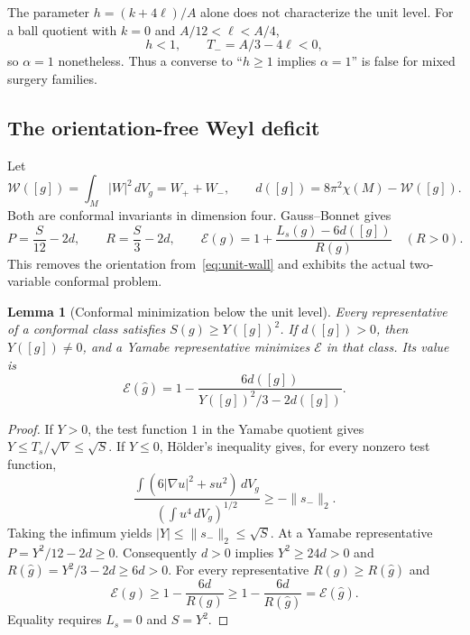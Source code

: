 \documentclass[11pt]{article}
\newcommand{\dd}{\,dV_g}
\newcommand{\cE}{\mathcal E}
\newtheorem{lemma}[theorem]{Lemma}
\theoremstyle{definition}
\theoremstyle{remark}
\begin{document}
The parameter $h=(k+4\ell)/A$ alone does not characterize the unit level.
For a ball quotient with $k=0$ and $A/12<\ell<A/4$,
\[
 h<1,\qquad T_-=A/3-4\ell<0,
\]
so $\alpha=1$ nonetheless. Thus a converse to
``$h\ge1$ implies $\alpha=1$'' is false for mixed surgery families.

\subsection{The orientation-free Weyl deficit}
\label{sec:weyl-deficit}

Let
\begin{equation}
 \mathcal W([g])=\int_M|W|^2\dd=W_++W_-,\qquad
 d([g])=8\pi^2\chi(M)-\mathcal W([g]).
 \label{eq:d-def}
\end{equation}
Both are conformal invariants in dimension four. Gauss--Bonnet gives
\begin{equation}
 P=\frac S{12}-2d,\qquad R=\frac S3-2d,
 \qquad
 \boxed{\cE(g)=1+\frac{L_s(g)-6d([g])}{R(g)}}\quad(R>0).
 \label{eq:orientation-free}
\end{equation}
This removes the orientation from~\eqref{eq:unit-wall} and exhibits
the actual two-variable conformal problem.

\begin{lemma}[Conformal minimization below the unit level]
\label{lem:conformal-min}
Every representative of a conformal class satisfies $S(g)\ge Y([g])^2$.
If $d([g])>0$, then $Y([g])\ne0$, and a Yamabe representative
minimizes $\cE$ in that class. Its value is
\begin{equation}
 \cE(\widehat g)=1-\frac{6d([g])}{Y([g])^2/3-2d([g])}.
 \label{eq:class-value}
\end{equation}
\end{lemma}
\begin{proof}
If $Y>0$, the test function $1$ in the Yamabe quotient gives
$Y\le T_s/\sqrt V\le\sqrt S$.
If $Y\le0$, H\"older's inequality gives, for every nonzero test function,
\[
 \frac{\int(6|\nabla u|^2+su^2)\dd}{(\int u^4\dd)^{1/2}}
 \ge-\|s_-\|_2.
\]
Taking the infimum yields $|Y|\le\|s_-\|_2\le\sqrt S$.
At a Yamabe representative $P=Y^2/12-2d\ge0$.
Consequently $d>0$ implies $Y^2\ge24d>0$ and
$R(\widehat g)=Y^2/3-2d\ge6d>0$.
For every representative $R(g)\ge R(\widehat g)$ and
\[
 \cE(g)\ge1-\frac{6d}{R(g)}
          \ge1-\frac{6d}{R(\widehat g)}=\cE(\widehat g).
\]
Equality requires $L_s=0$ and $S=Y^2$.
\end{proof}
\end{document}
